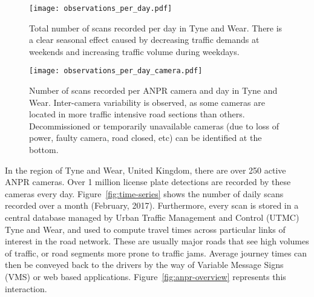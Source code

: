 \begin{figure*}[t]
\centering
\begin{subfigure}[t]{.48\textwidth}
  \centering
  \texttt{[image: observations\_per\_day.pdf]}
  \caption{Total number of scans recorded per day in Tyne and Wear. There is a clear seasonal effect caused by decreasing traffic demands at weekends and increasing traffic volume during weekdays.}
  \label{fig:observations-per-day}
\end{subfigure}\hfill
\begin{subfigure}[t]{.48\textwidth}
  \centering
  \texttt{[image: observations\_per\_day\_camera.pdf]}
  \caption{Number of scans recorded per ANPR camera and day in Tyne and Wear. Inter-camera variability is observed, as some cameras are located in more traffic intensive road sections than others. Decommissioned or temporarily unavailable cameras (due to loss of power, faulty camera, road closed, etc) can be identified at the bottom.}
  \label{fig:observations-per-camera-day}
\end{subfigure}
\caption{License plate scans recorded by ANPR cameras during February 2017, in the region of Tyne and Wear, United Kingdom.}
\label{fig:time-series}
\end{figure*}

In the region of Tyne and Wear, United Kingdom, there are over 250 active ANPR cameras. Over 1 million license plate detections are recorded by these cameras every day. Figure~\ref{fig:time-series} shows the number of daily scans recorded over a month (February, 2017). Furthermore, every scan is stored in a central database managed by Urban Traffic Management and Control (UTMC) Tyne and Wear, and used to compute travel times across particular links of interest in the road network. These are usually major roads that see high volumes of traffic, or road segments more prone to traffic jams. Average journey times can then be conveyed back to the drivers by the way of Variable Message Signs (VMS) or web based applications. Figure~\ref{fig:anpr-overview} represents this interaction.


